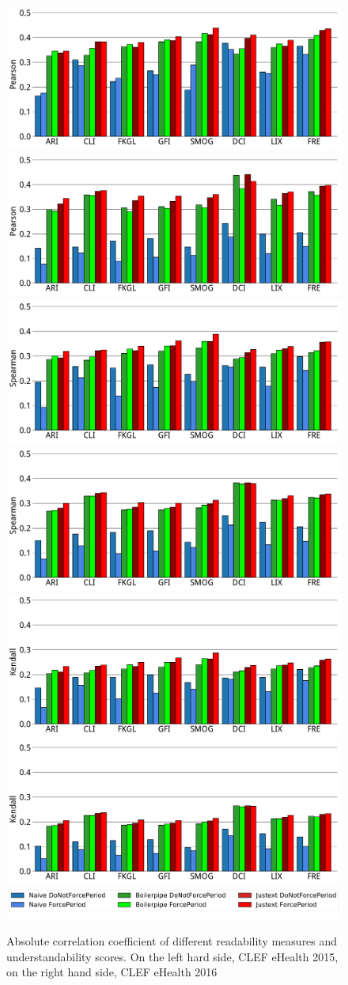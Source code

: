 \begin{figure}[th!]
   \centering
   \includegraphics[width=.45\textwidth]{graphics/bar_corr_pearson15_values}
   \includegraphics[width=.45\textwidth]{graphics/bar_corr_pearson16_values}
   \includegraphics[width=.45\textwidth]{graphics/bar_corr_spearman15_values}
   \includegraphics[width=.45\textwidth]{graphics/bar_corr_spearman16_values}
   \includegraphics[width=.45\textwidth]{graphics/bar_corr_kendalltau15_values}
   \includegraphics[width=.45\textwidth]{graphics/bar_corr_kendalltau16_values}
   \includegraphics[width=.8\textwidth]{graphics/legend62}
    \caption{Absolute correlation coefficient of different readability measures and understandability scores. On the left hard side, CLEF eHealth 2015, on the right hand side, CLEF eHealth 2016}
   \label{fig:bar_corr_clef15}
\end{figure}

